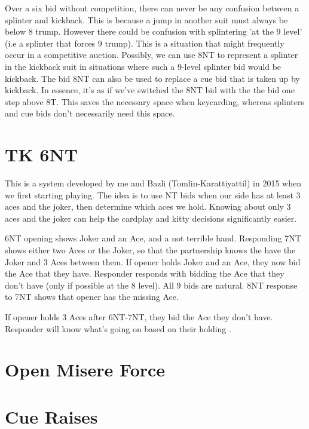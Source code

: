 \documentclass[a4paper]{report}
\theoremstyle{question}
\theoremstyle{theorem}
\theoremstyle{definition}
\newcommand{\<}{\left\langle}%
\renewcommand{\>}{\right\rangle}%
\begin{document}
Over a six bid without competition, there can never be any confusion between a splinter and kickback. This is because a jump in another suit must always be below 8 trump. However there could be confusion with splintering 'at the 9 level' (i.e a splinter that forces 9 trump). This is a situation that might frequently occur in a competitive auction. Possibly, we can use 8NT to represent a splinter in the kickback suit in situations where such a 9-level splinter bid would be kickback. The bid 8NT can also be used to replace a cue bid that is taken up by kickback. In essence, it's as if we've switched the 8NT bid with the the bid one step above 8T. This saves the necessary space when keycarding, whereas splinters and cue bids don't necessarily need this space.








\section*{TK 6NT}

This is a system developed by me and Bazli (Tomlin-Karattiyattil) in 2015 when we first starting playing. The idea is to use NT bids when our side has at least 3 aces and the joker, then determine which aces we hold. Knowing about only 3 aces and the joker can help the cardplay and kitty decisions significantly easier.

6NT opening shows Joker and an Ace, and a not terrible hand. Responding 7NT shows either two Aces or the Joker, so that the partnership knows the have the Joker and 3 Aces between them. If opener holds Joker and an Ace, they now bid the Ace that they have. Responder responds with bidding the Ace that they don't have (only if possible at the 8 level). All 9 bids are natural. 8NT response to 7NT shows that opener has the missing Ace.

If opener holds 3 Aces after 6NT-7NT, they bid the Ace they don't have. Responder will know what's going on based on their holding . 




\section*{Open Misere Force}

\section*{Cue Raises}
\end{document}
